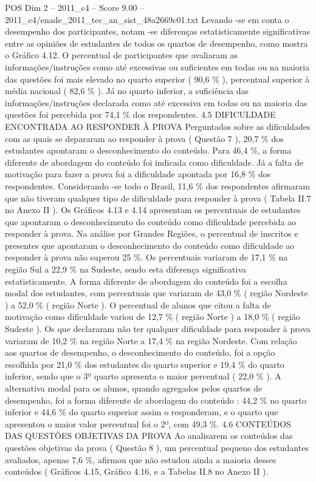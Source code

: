 \begin{textsample}{POS Dim 2 – 2011\_c4 – Score 9.00 – 2011\_c4/enade\_2011\_tec\_an\_sist\_48a2669c01.txt}
Levando -se em conta o desempenho dos participantes, notam -se diferenças estatisticamente significativas entre as opiniões de estudantes de todos os quartos de desempenho, como mostra o Gráfico 4.12.
O percentual de participantes que avaliaram as informações/instruções como até excessivas ou suficientes em todas ou na maioria das questões foi mais elevado no quarto superior ( 90,6 \% ), percentual superior à média nacional ( 82,6 \% ).
Já no quarto inferior, a suficiência das informações/instruções declarada como até excessiva em todas ou na maioria das questões foi percebida por 74,1 \% dos respondentes. 4.5 DIFICULDADE ENCONTRADA AO RESPONDER À PROVA Perguntados sobre as dificuldades com as quais se depararam ao responder à prova ( Questão 7 ), 20,7 \% dos estudantes apontaram o desconhecimento do conteúdo.
Para 46,4 \%, a forma diferente de abordagem do conteúdo foi indicada como dificuldade.
Já a falta de motivação para fazer a prova foi a dificuldade apontada por 16,8 \% dos respondentes.
Considerando -se todo o Brasil, 11,6 \% dos respondentes afirmaram que não tiveram qualquer tipo de dificuldade para responder à prova ( Tabela II.7 no Anexo II ).
Os Gráficos 4.13 e 4.14 apresentam os percentuais de estudantes que apontaram o desconhecimento do conteúdo como dificuldade percebida ao responder à prova.
Na análise por Grandes Regiões, o percentual de inscritos e presentes que apontaram o desconhecimento do conteúdo como dificuldade ao responder à prova não superou 25 \%.
Os percentuais variaram de 17,1 \% na região Sul a 22,9 \% na Sudeste, sendo esta diferença significativa estatisticamente.
A forma diferente de abordagem do conteúdo foi a escolha modal dos estudantes, com percentuais que variaram de 43,0 \% ( região Nordeste ) a 52,0 \% ( região Norte ).
O percentual de alunos que citou a falta de motivação como dificuldade variou de 12,7 \% ( região Norte ) a 18,0 \% ( região Sudeste ).
Os que declararam não ter qualquer dificuldade para responder à prova variaram de 10,2 \% na região Norte a 17,4 \% na região Nordeste.
Com relação aos quartos de desempenho, o desconhecimento do conteúdo, foi a opção escolhida por 21,0 \% dos estudantes do quarto superior e 19,4 \% do quarto inferior, sendo que o 3º quarto apresenta o maior percentual ( 22,0 \% ).
A alternativa modal para os alunos, quando agregados pelos quartos de desempenho, foi a forma diferente de abordagem do conteúdo : 44,2 \% no quarto inferior e 44,6 \% do quarto superior assim o responderam, e o quarto que apresentou o maior valor percentual foi o 2º, com 49,3 \%. 4.6 CONTEÚDOS DAS QUESTÕES OBJETIVAS DA PROVA Ao analisarem os conteúdos das questões objetivas da prova ( Questão 8 ), um percentual pequeno dos estudantes avaliados, apenas 7,6 \%, afirmou que não estudou ainda a maioria desses conteúdos ( Gráficos 4.15, Gráfico 4.16, e a Tabelas II.8 no Anexo II ).

\end{textsample}

